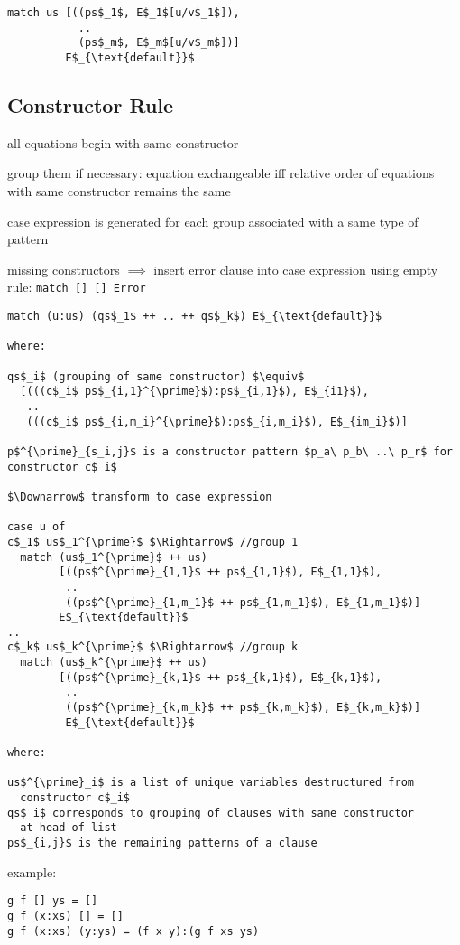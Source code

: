 \documentclass[8pt]{extarticle}
\begin{document}
\begin{multicols*}{2}
\begin{lstlisting}
match us [((ps$_1$, E$_1$[u/v$_1$]),
           ..
           (ps$_m$, E$_m$[u/v$_m$])]
         E$_{\text{default}}$
\end{lstlisting}

\subsection{Constructor Rule}

all equations begin with same constructor

group them if necessary: equation exchangeable iff relative order of equations with same constructor remains the same

case expression is generated for each group associated with a same type of pattern

missing constructors $\implies$ insert error clause into case expression using empty rule: \verb|match [] [] Error|

\begin{lstlisting}
match (u:us) (qs$_1$ ++ .. ++ qs$_k$) E$_{\text{default}}$
  
where:

qs$_i$ (grouping of same constructor) $\equiv$
  [(((c$_i$ ps$_{i,1}^{\prime}$):ps$_{i,1}$), E$_{i1}$),
   ..
   (((c$_i$ ps$_{i,m_i}^{\prime}$):ps$_{i,m_i}$), E$_{im_i}$)]

p$^{\prime}_{s_i,j}$ is a constructor pattern $p_a\ p_b\ ..\ p_r$ for constructor c$_i$

$\Downarrow$ transform to case expression

case u of
c$_1$ us$_1^{\prime}$ $\Rightarrow$ //group 1
  match (us$_1^{\prime}$ ++ us)
        [((ps$^{\prime}_{1,1}$ ++ ps$_{1,1}$), E$_{1,1}$),
         ..
         ((ps$^{\prime}_{1,m_1}$ ++ ps$_{1,m_1}$), E$_{1,m_1}$)]
        E$_{\text{default}}$
..
c$_k$ us$_k^{\prime}$ $\Rightarrow$ //group k
  match (us$_k^{\prime}$ ++ us)
        [((ps$^{\prime}_{k,1}$ ++ ps$_{k,1}$), E$_{k,1}$),
         ..
         ((ps$^{\prime}_{k,m_k}$ ++ ps$_{k,m_k}$), E$_{k,m_k}$)]
         E$_{\text{default}}$

where:
         
us$^{\prime}_i$ is a list of unique variables destructured from
  constructor c$_i$
qs$_i$ corresponds to grouping of clauses with same constructor
  at head of list  
ps$_{i,j}$ is the remaining patterns of a clause
\end{lstlisting}

example:

\begin{lstlisting}
g f [] ys = []
g f (x:xs) [] = []
g f (x:xs) (y:ys) = (f x y):(g f xs ys)


\end{lstlisting}
\end{multicols*}
\end{document}
